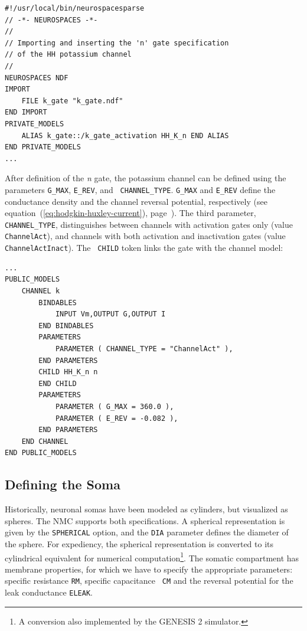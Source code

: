 \documentclass[12pt]{article}
\begin{document}
\begin{verbatim}
#!/usr/local/bin/neurospacesparse
// -*- NEUROSPACES -*-
//
// Importing and inserting the 'n' gate specification
// of the HH potassium channel
//
NEUROSPACES NDF
IMPORT
    FILE k_gate "k_gate.ndf"
END IMPORT
PRIVATE_MODELS
    ALIAS k_gate::/k_gate_activation HH_K_n END ALIAS
END PRIVATE_MODELS
...
\end{verbatim}

After definition of the {\it n} gate, the potassium channel can be defined
using the parameters {\tt G\_MAX}, {\tt E\_REV}, and {\tt
  CHANNEL\_TYPE}.  {\tt G\_MAX} and {\tt E\_REV} define the
conductance density and the channel reversal potential, respectively
(see equation~(\ref{eq:hodgkin-huxley-current}),
page~\pageref{eq:hodgkin-huxley-current}).  The third parameter, {\tt
  CHANNEL\_TYPE}, distinguishes between channels with activation gates
only (value {\tt ChannelAct}), and channels with both activation
and inactivation gates (value {\tt ChannelActInact}).  The {\tt
  CHILD} token links the gate with the channel model:

\begin{verbatim}
...
PUBLIC_MODELS
    CHANNEL k
        BINDABLES
            INPUT Vm,OUTPUT G,OUTPUT I
        END BINDABLES
        PARAMETERS
            PARAMETER ( CHANNEL_TYPE = "ChannelAct" ),
        END PARAMETERS
        CHILD HH_K_n n
        END CHILD
        PARAMETERS
            PARAMETER ( G_MAX = 360.0 ),
            PARAMETER ( E_REV = -0.082 ),
        END PARAMETERS
    END CHANNEL
END PUBLIC_MODELS
\end{verbatim}

\subsection{Defining the Soma}
\label{sec:defining-soma}

Historically, neuronal somas have been modeled as cylinders, but
visualized as spheres.  The NMC supports both specifications.  A
spherical representation is given by the {\tt SPHERICAL} option, and
the {\tt DIA} parameter defines the diameter of the sphere.  For
expediency, the spherical representation is converted to its
cylindrical equivalent for numerical computation\footnote{A
  conversion also implemented by the GENESIS 2 simulator.}.  The somatic compartment
has membrane properties, for which we have to specify the appropriate
parameters: specific resistance {\tt RM}, specific capacitance {\tt
  CM} and the reversal potential for the leak conductance {\tt ELEAK}.
\end{document}
